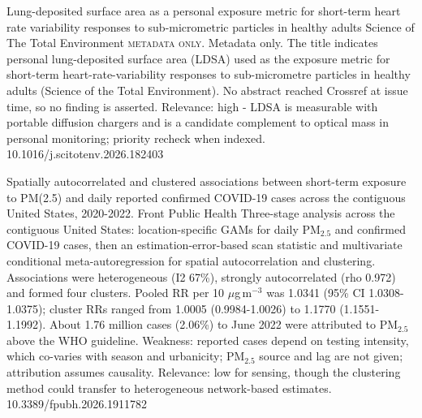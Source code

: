 \documentclass[10pt]{article}
\begin{document}
{Lung-deposited surface area as a personal exposure metric for short-term heart rate variability responses to sub-micrometric particles in healthy adults}
{Science of The Total Environment}
{\textsc{metadata only.} Metadata only. The title indicates personal lung-deposited surface area (LDSA) used as the exposure metric for short-term heart-rate-variability responses to sub-micrometre particles in healthy adults (Science of the Total Environment). No abstract reached Crossref at issue time, so no finding is asserted. Relevance: high - LDSA is measurable with portable diffusion chargers and is a candidate complement to optical mass in personal monitoring; priority recheck when indexed.}
{10.1016/j.scitotenv.2026.182403}

\par{}\baselineskip{}\baselineskip
{}

{Spatially autocorrelated and clustered associations between short-term exposure to PM(2.5) and daily reported confirmed COVID-19 cases across the contiguous United States, 2020-2022.}
{Front Public Health}
{Three-stage analysis across the contiguous United States: location-specific GAMs for daily PM$_{2.5}$ and confirmed COVID-19 cases, then an estimation-error-based scan statistic and multivariate conditional meta-autoregression for spatial autocorrelation and clustering. Associations were heterogeneous (I2 67\%), strongly autocorrelated (rho 0.972) and formed four clusters. Pooled RR per 10 $\mu$g\,m$^{-3}$ was 1.0341 (95\% CI 1.0308-1.0375); cluster RRs ranged from 1.0005 (0.9984-1.0026) to 1.1770 (1.1551-1.1992). About 1.76 million cases (2.06\%) to June 2022 were attributed to PM$_{2.5}$ above the WHO guideline. Weakness: reported cases depend on testing intensity, which co-varies with season and urbanicity; PM$_{2.5}$ source and lag are not given; attribution assumes causality. Relevance: low for sensing, though the clustering method could transfer to heterogeneous network-based estimates.}
{10.3389/fpubh.2026.1911782}
\end{document}
